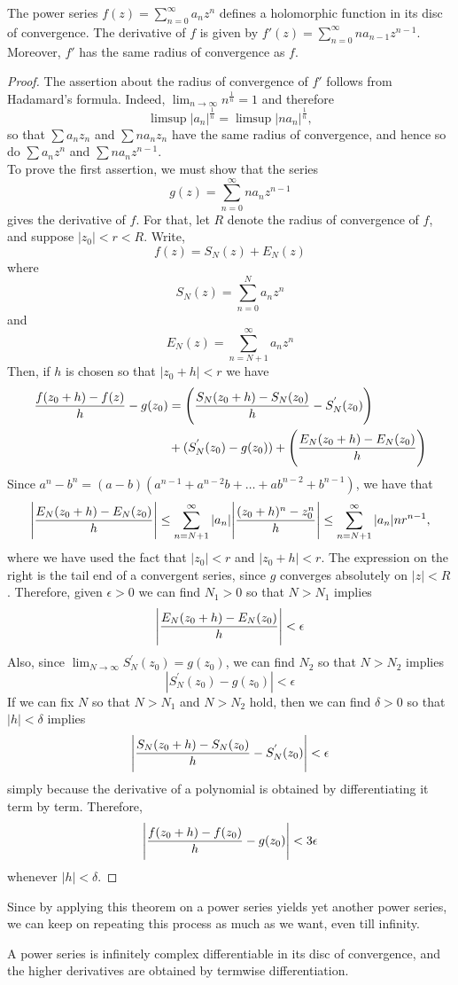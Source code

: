 \begin{theorem}
    The power series $f(z) = \sum_{n=0}^{\infty} a_nz^n$ defines a holomorphic function in its disc of
    convergence. The derivative of $f$ is given by $f'(z) = \sum_{n=0}^{\infty} na_{n-1}z^{n-1}$.
    Moreover, $f'$ has the same radius of convergence as $f$.
\end{theorem}
\begin{proof}
    The assertion about the radius of convergence of $f'$ follows from Hadamard's formula. Indeed,
    $\lim_{n\to\infty} n^{\frac{1}{n}} = 1$ and therefore
    \[ \limsup |a_n|^{\frac{1}{n}} = \limsup |na_n|^{\frac{1}{n}}, \]
    so that $\sum a_nz_n$ and $\sum na_nz_n$ have the same radius of convergence, and hence so do
    $\sum a_nz^n$ and $\sum na_nz^{n-1}$.\\
    To prove the first assertion, we must show that the series
    \[ g(z) = \sum_{n=0}^{\infty} na_nz^{n-1} \]
    gives the derivative of $f$. For that, let $R$ denote the radius of convergence of $f$, and suppose
    $|z_0| < r < R$. Write,
    \[ f(z) = S_{N}(z) + E_{N}(z) \]
    where
    \[ S_N(z) = \sum_{n=0}^{N} a_nz^n\]
    and
    \[ E_N(z) = \sum_{n=N+1}^{\infty} a_nz^n \]
    Then, if $h$ is chosen so that $|z_0 + h| < r$ we have
    \begin{align*}
        \frac{f(z_0+h) - f(z)}{h} - g(z_0) &= \Bigg{(}\frac{S_N(z_0+h)-S_N(z_0)}{h}-S_N^{'}(z_0)\Bigg{)} \\
        &+ (S_N^{'}(z_0) - g(z_0)) + \Bigg{(}\frac{E_N(z_0+h)-E_N(z_0)}{h}\Bigg{)}
    \end{align*}
    Since $a^n-b^n = (a-b)(a^{n-1}+a^{n-2}b + \hdots + ab^{n-2}+b^{n-1})$, we have that
    \[ \Bigg{|}\frac{E_N(z_0+h)-E_N(z_0)}{h}\Bigg{|}\leq\sum_{n=N+1}^{\infty}|a_n|\Bigg{|}\frac{(z_0+h)^n-z_0^n}{h}
        \Bigg{|}\leq \sum_{n=N+1}^{\infty} |a_n|nr^{n-1},\]
    where we have used the fact that $|z_0|<r$ and $|z_0+h|<r$. The expression on the right is the tail end of
    a convergent series, since $g$ converges absolutely on $|z|<R$. Therefore, given $\epsilon>0$ we can find
    $N_1 > 0$ so that $N > N_1$ implies
    \[ \Bigg{|}\frac{E_N(z_0+h)-E_N(z_0)}{h}\Bigg{|} < \epsilon \]
    Also, since $\lim_{N\to\infty} S_N^{'}(z_0) = g(z_0)$, we can find $N_2$ so that $N > N_2$ implies
    \[ |S_N^{'}(z_0) - g(z_0)| < \epsilon \]
    If we can fix $N$ so that $N > N_1$ and $N > N_2$ hold, then we can find $\delta > 0$ so that $|h| < \delta$
    implies
    \[ \Bigg{|}\frac{S_N(z_0+h) - S_N(z_0)}{h} - S_N^{'}(z_0)\Bigg{|} < \epsilon \]
    simply because the derivative of a polynomial is obtained by differentiating it term by term. Therefore,
    \[ \Bigg{|}\frac{f(z_0+h)-f(z_0)}{h} - g(z_0)\Bigg{|} < 3\epsilon \]
    whenever $|h| < \delta$.
\end{proof}

Since by applying this theorem on a power series yields yet another power series, we can keep on repeating this
process as much as we want, even till infinity.

\begin{theorem}
    A power series is infinitely complex differentiable in its disc of convergence, and the higher derivatives
    are obtained by termwise differentiation.
\end{theorem}
